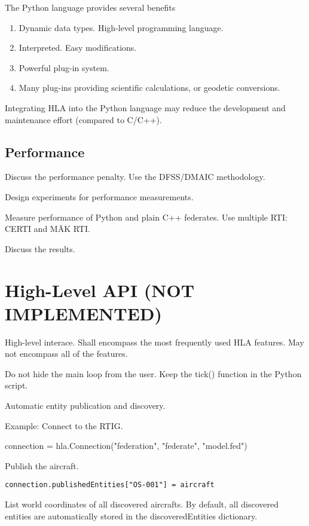 \documentclass{howto}
\begin{document}
The Python language provides several benefits
\begin{enumerate}
\item Dynamic data types. High-level programming language.
\item Interpreted. Easy modifications.
\item Powerful plug-in system.
\item Many plug-ins providing scientific calculations, or geodetic conversions.
\end{enumerate}

Integrating HLA into the Python language may reduce the development and
maintenance effort (compared to C/C++).

\subsection{Performance}

Discuss the performance penalty. Use the DFSS/DMAIC methodology.

Design experiments for performance measurements.

Measure performance of Python and plain C++ federates. Use multiple RTI: CERTI and MÄK RTI.

Discuss the results.





\section{High-Level API (NOT IMPLEMENTED)}
High-level interace. Shall encompass the most frequently used HLA features. May not encompass all of the features.

Do not hide the main loop from the user. Keep the tick() function in the Python script.

Automatic entity publication and discovery.

Example:
Connect to the RTIG.

connection = hla.Connection("federation", "federate", "model.fed")

Publish the aircraft.

\begin{verbatim}
connection.publishedEntities["OS-001"] = aircraft
\end{verbatim}

List world coordinates of all discovered aircrafts. By default, all discovered
entities are automatically stored in the discoveredEntities dictionary.
\end{document}
